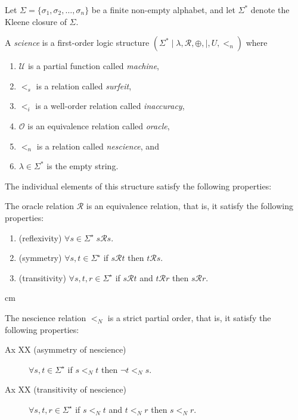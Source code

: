 Let $\Sigma = \{ \sigma_1, \sigma_2, \ldots, \sigma_n \}$ be a finite non-empty alphabet, and let $\Sigma^\ast$ denote the Kleene closure of $\Sigma$.

A \emph{science} is a first-order logic structure $(\Sigma^\ast \mid \lambda, \mathcal{R}, \oplus, \mid, U , <_n)$ where

\begin{enumerate}[label=(\roman*)]
\item $\mathcal{U}$ is a partial function called \emph{machine},
\item $<_s$ is a relation called \emph{surfeit},
\item $<_i$ is a well-order relation called \emph{inaccuracy},
\item $\mathcal{O}$ is an equivalence relation called \emph{oracle},
\item $<_n$ is a relation called \emph{nescience}, and
\item $\lambda \in \Sigma^\ast$ is the empty string.
\end{enumerate}

\smallskip

The individual elements of this structure satisfy the following properties:

The oracle relation $\mathcal{R}$ is an equivalence relation, that is, it satisfy the following properties:

\vskip 0.25cm

\begin{enumerate}[label=(\roman*)]
\item (reflexivity) $\forall s \in \Sigma^\star \; s \mathcal{R} s$.
\item (symmetry) $\forall s , t \in \Sigma^\star$ if $s \mathcal{R} t$ then $t \mathcal{R} s$.
\item (transitivity) $\forall s , t, r \in \Sigma^\star$ if $s \mathcal{R} t$ and $t \mathcal{R} r$ then $s \mathcal{R} r$.
\end{enumerate}

 cm

The nescience relation $<_N$ is a strict partial order, that is, it satisfy the following properties:

\vskip 0.25cm

\begin{description}
\item[Ax XX (asymmetry of nescience)] $\forall s , t \in \Sigma^\star$ if $s <_N t$ then $\lnot t <_N s$.
\item[Ax XX (transitivity of nescience)] $\forall s , t, r \in \Sigma^\star$ if $s <_N t$ and $t <_N r$ then $s <_N r$.
\end{description}

